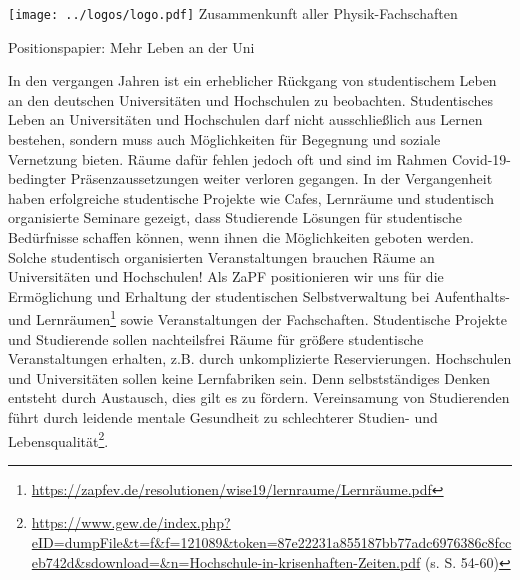 \documentclass[DIV=calc]{scrartcl}
\let\oldgrqq=\grqq
\def\grqq{\oldgrqq\xspace}
\begin{document}
\hspace{0.87\textwidth}
\begin{minipage}{120pt}
	\vspace{-1.8cm}
	\texttt{[image: ../logos/logo.pdf]}
	\centering
	\small Zusammenkunft aller Physik-Fachschaften
\end{minipage}

\begin{center}
  \huge{Positionspapier: Mehr Leben an der Uni}\vspace{.25\baselineskip}\\
  \normalsize
\end{center}
\vspace{1cm}







In den vergangen Jahren ist ein erheblicher Rückgang von studentischem Leben an den deutschen Universitäten und Hochschulen zu beobachten. Studentisches Leben an Universitäten und Hochschulen darf nicht ausschließlich aus Lernen bestehen, sondern muss auch Möglichkeiten für Begegnung und soziale Vernetzung bieten. Räume dafür fehlen jedoch oft und sind im Rahmen Covid-19-bedingter Präsenzaussetzungen weiter verloren gegangen.
In der Vergangenheit haben erfolgreiche studentische Projekte wie Cafes, Lernräume und studentisch organisierte Seminare gezeigt, dass Studierende Lösungen für studentische Bedürfnisse schaffen können, wenn ihnen die Möglichkeiten geboten werden.
Solche studentisch organisierten Veranstaltungen brauchen Räume an Universitäten und Hochschulen!
Als ZaPF positionieren wir uns für die Ermöglichung und Erhaltung der studentischen Selbstverwaltung bei Aufenthalts- und Lernräumen\footnote{\url{https://zapfev.de/resolutionen/wise19/lernraume/Lernräume.pdf}} sowie Veranstaltungen der Fachschaften.
Studentische Projekte und Studierende sollen nachteilsfrei Räume für größere studentische Veranstaltungen erhalten, z.B. durch unkomplizierte Reservierungen. Hochschulen und Universitäten sollen keine \glqq Lernfabriken\grqq sein. Denn selbstständiges Denken entsteht durch Austausch, dies gilt es zu fördern. Vereinsamung von Studierenden führt durch leidende mentale Gesundheit zu schlechterer Studien- und Lebensqualität\footnote{\url{https://www.gew.de/index.php?eID=dumpFile&t=f&f=121089&token=87e22231a855187bb77adc6976386c8fcceb742d&sdownload=&n=Hochschule-in-krisenhaften-Zeiten.pdf} (s. S. 54-60)}.
\end{document}
